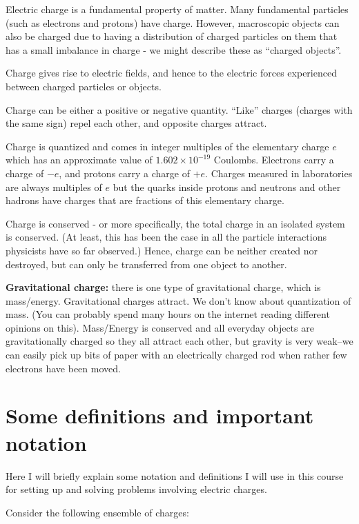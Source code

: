 \documentclass[
  letterpaper,
  DIV=11,
  numbers=noendperiod]{scrreprt}
\begin{document}
Electric charge is a fundamental property of matter. Many fundamental
particles (such as electrons and protons) have charge. However,
macroscopic objects can also be charged due to having a distribution of
charged particles on them that has a small imbalance in charge - we
might describe these as ``charged objects''.

Charge gives rise to electric fields, and hence to the electric forces
experienced between charged particles or objects.

Charge can be either a positive or negative quantity. ``Like'' charges
(charges with the same sign) repel each other, and opposite charges
attract.

Charge is quantized and comes in integer multiples of the elementary
charge \(e\) which has an approximate value of
\(1.602 \times 10 ^{-19}\) Coulombs. Electrons carry a charge of \(-e\),
and protons carry a charge of \(+e\). Charges measured in laboratories
are always multiples of \(e\) but the quarks inside protons and neutrons
and other hadrons have charges that are fractions of this elementary
charge.

Charge is conserved - or more specifically, the total charge in an
isolated system is conserved. (At least, this has been the case in all
the particle interactions physicists have so far observed.) Hence,
charge can be neither created nor destroyed, but can only be transferred
from one object to another.

\textbf{Gravitational charge:} there is one type of gravitational
charge, which is mass/energy. Gravitational charges attract. We don't
know about quantization of mass. (You can probably spend many hours on
the internet reading different opinions on this). Mass/Energy is
conserved and all everyday objects are gravitationally charged so they
all attract each other, but gravity is very weak--we can easily pick up
bits of paper with an electrically charged rod when rather few electrons
have been moved.

\section{Some definitions and important
notation}\label{some-definitions-and-important-notation}

Here I will briefly explain some notation and definitions I will use in
this course for setting up and solving problems involving electric
charges.

Consider the following ensemble of charges:
\end{document}
